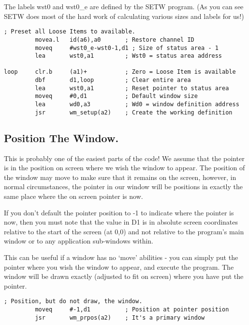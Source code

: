 The labels wst0 and wst0\_e are defined by the SETW program. (As
      you can see SETW does most of the hard work of calculating various sizes
      and labels for us!)

\begin{lstlisting}[firstnumber=last,caption={EasyPEasy Standard Code - Loose Item Initialisation},label={lst:EasyPEasy-4}]
; Preset all Loose Items to available.
         movea.l   id(a6),a0       ; Restore channel ID
         moveq     #wst0_e-wst0-1,d1 ; Size of status area - 1
         lea       wst0,a1         ; Wst0 = status area address

loop     clr.b     (a1)+           ; Zero = Loose Item is available
         dbf       d1,loop         ; Clear entire area
         lea       wst0,a1         ; Reset pointer to status area
         moveq     #0,d1           ; Default window size
         lea       wd0,a3          ; Wd0 = window definition address
         jsr       wm_setup(a2)    ; Create the working definition
\end{lstlisting}

\subsection{Position The Window.}

This is probably one of the easiest parts of the code! We assume
      that the pointer is in the position on screen where we wish the window
      to appear. The position of the window may move to make sure that it
      remains on the screen, however, in normal circumstances, the pointer in
      our window will be positions in exactly the same place where the on
      screen pointer is now.

\begin{note}
If you don't default the pointer position to -{}1 to indicate
        where the pointer is now, then you must note that the value in D1 is
        in absolute screen coordinates relative to the start of the screen (at
        0,0) and not relative to the program's main window or to any
        application sub-{}windows within.
\end{note}

This can be useful if a window has no `move' abilities -{} you can
      simply put the pointer where you wish the window to appear, and execute
      the program. The window will be drawn exactly (adjusted to fit on
      screen) where you have put the pointer.

\begin{lstlisting}[firstnumber=last,caption={EasyPEasy Standard Code - Position the Window},label={lst:EasyPEasy-5}]
; Position, but do not draw, the window.
         moveq     #-1,d1          ; Position at pointer position
         jsr       wm_prpos(a2)    ; It's a primary window
\end{lstlisting}

